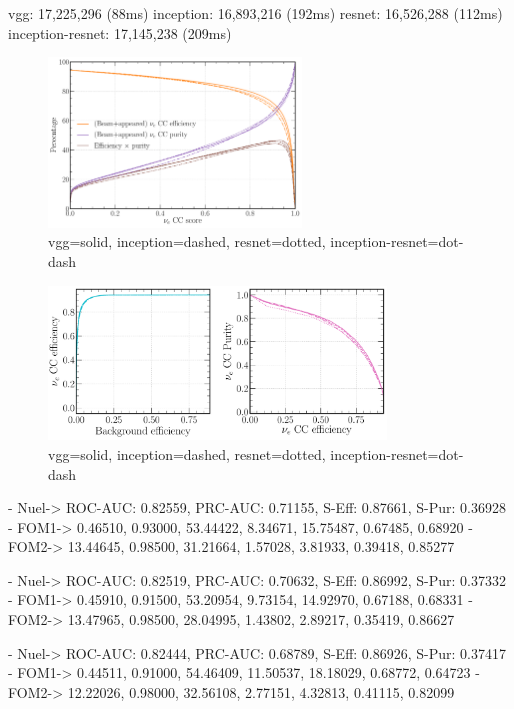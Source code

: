 vgg: 17,225,296 (88ms)
inception: 16,893,216 (192ms)
resnet: 16,526,288 (112ms)
inception-resnet: 17,145,238 (209ms)

\begin{figure} %
    \includegraphics[width=0.6\textwidth]{diagrams/7-cvn/chipsnet/arch_nuel_eff_curves.pdf}
    \caption[arch nuel eff curves short]
    {vgg=solid, inception=dashed, resnet=dotted, inception-resnet=dot-dash}
    \label{fig:arch_nuel_eff_curves}
\end{figure}

\begin{figure} %
    \includegraphics[width=0.8\textwidth]{diagrams/7-cvn/chipsnet/arch_nuel_comp_curves.pdf}
    \caption[arch nuel comp curves short]
    {vgg=solid, inception=dashed, resnet=dotted, inception-resnet=dot-dash}
    \label{fig:arch_nuel_comp_curves}
\end{figure}

- Nuel-> ROC-AUC: 0.82559, PRC-AUC: 0.71155, S-Eff: 0.87661, S-Pur: 0.36928
- FOM1-> 0.46510, 0.93000, 53.44422, 8.34671, 15.75487, 0.67485, 0.68920
- FOM2-> 13.44645, 0.98500, 31.21664, 1.57028, 3.81933, 0.39418, 0.85277

- Nuel-> ROC-AUC: 0.82519, PRC-AUC: 0.70632, S-Eff: 0.86992, S-Pur: 0.37332
- FOM1-> 0.45910, 0.91500, 53.20954, 9.73154, 14.92970, 0.67188, 0.68331
- FOM2-> 13.47965, 0.98500, 28.04995, 1.43802, 2.89217, 0.35419, 0.86627

- Nuel-> ROC-AUC: 0.82444, PRC-AUC: 0.68789, S-Eff: 0.86926, S-Pur: 0.37417
- FOM1-> 0.44511, 0.91000, 54.46409, 11.50537, 18.18029, 0.68772, 0.64723
- FOM2-> 12.22026, 0.98000, 32.56108, 2.77151, 4.32813, 0.41115, 0.82099


